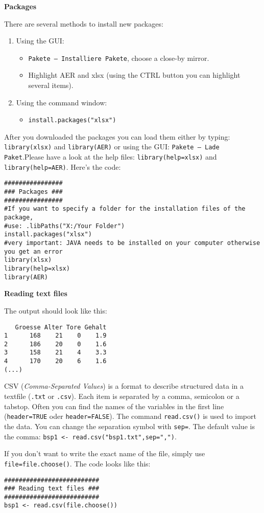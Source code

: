 \begin{Solution}{1.5}
\textbf{Packages}

There are several methods to install new packages:
\begin{enumerate}
  \item Using the GUI:
    \begin{itemize}
     \item \texttt{Pakete -- Installiere Pakete}, choose a close-by mirror.
     \item Highlight AER and xlsx (using the CTRL button you can highlight several items).
     \end{itemize}
  \item Using the command window:
     \begin{itemize}
       \item \texttt{install.packages("xlsx")}
     \end{itemize}
\end{enumerate}
     After you downloaded the packages you can load them either by typing: \newline \texttt{library(xlsx)} and \texttt{library(AER)} or using the GUI: \texttt{Pakete -- Lade Paket}.\newline Please have a look at the help files: \texttt{library(help=xlsx)} and \texttt{library(help=AER)}. Here's the code:
\begin{verbatim}
################
### Packages ###
################
#If you want to specify a folder for the installation files of the package,
#use: .libPaths("X:/Your Folder")
install.packages("xlsx")
#very important: JAVA needs to be installed on your computer otherwise you get an error
library(xlsx)
library(help=xlsx)
library(AER)
\end{verbatim}
\end{Solution}
\begin{Solution}{2.1}
\textbf{Reading text files}

The output should look like this:
\begin{verbatim}
   Groesse Alter Tore Gehalt
1      168    21    0    1.9
2      186    20    0    1.6
3      158    21    4    3.3
4      170    20    6    1.6
(...)
\end{verbatim}
CSV (\emph{Comma-Separated Values}) is a format to describe structured data in a textfile (\texttt{.txt} or \texttt{.csv}). Each item is separated by a comma, semicolon or a tabstop. Often you can find the names of the variables in the first line (\texttt{header=TRUE} oder \texttt{header=FALSE}). The command \texttt{read.csv()} is used to import the data. You can change the separation symbol with \texttt{sep=}. The default value is the comma: \texttt{bsp1 <- read.csv("bsp1.txt",sep=",")}.

If you don't want to write the exact name of the file, simply use \texttt{file=file.choose()}. The code looks like this:
\begin{verbatim}
##########################
### Reading text files ###
##########################
bsp1 <- read.csv(file.choose())
\end{verbatim}
\end{Solution}
